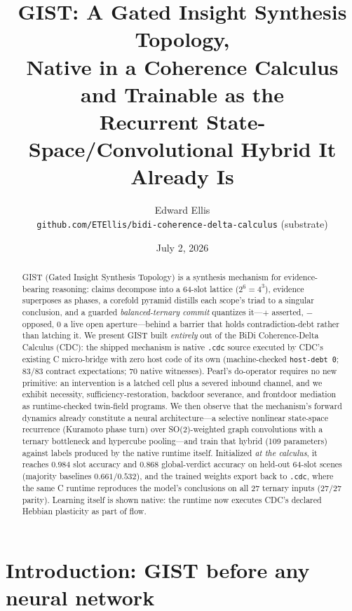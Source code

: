 \documentclass[11pt]{article}
\title{GIST: A Gated Insight Synthesis Topology,\\
Native in a Coherence Calculus and Trainable as the\\
Recurrent State-Space/Convolutional Hybrid It Already Is}
\author{Edward Ellis\\
\small\texttt{github.com/ETEllis/bidi-coherence-delta-calculus} (substrate)}
\date{July 2, 2026}
\begin{document}
\maketitle

\begin{abstract}
GIST (Gated Insight Synthesis Topology) is a synthesis mechanism for
evidence-bearing reasoning: claims decompose into a 64-slot lattice
($2^6{=}4^3$), evidence superposes as phases, a corefold pyramid distills
each scope's triad to a singular conclusion, and a guarded
\emph{balanced-ternary commit} quantizes it---$+$ asserted, $-$ opposed,
$0$ a live open aperture---behind a barrier that holds contradiction-debt
rather than latching it. We present GIST built \emph{entirely} out of the
BiDi Coherence-Delta Calculus (CDC): the shipped mechanism is native
\texttt{.cdc} source executed by CDC's existing C micro-bridge with zero
host code of its own (machine-checked \texttt{host-debt 0}; 83/83 contract
expectations; 70 native witnesses). Pearl's do-operator requires no new
primitive: an intervention is a latched cell plus a severed inbound
channel, and we exhibit necessity, sufficiency-restoration, backdoor
severance, and frontdoor mediation as runtime-checked twin-field programs.
We then observe that the mechanism's forward dynamics already constitute a
neural architecture---a selective nonlinear state-space recurrence
(Kuramoto phase turn) over SO(2)-weighted graph convolutions with a ternary
bottleneck and hypercube pooling---and train that hybrid (109 parameters)
against labels produced by the native runtime itself. Initialized
\emph{at the calculus}, it reaches $0.984$ slot accuracy and $0.868$
global-verdict accuracy on held-out 64-slot scenes (majority baselines
$0.661/0.532$), and the trained weights export back to \texttt{.cdc},
where the same C runtime reproduces the model's conclusions on all 27
ternary inputs ($27/27$ parity). Learning itself is shown native: the
runtime now executes CDC's declared Hebbian plasticity as part of flow.
\end{abstract}

\section{Introduction: GIST before any neural network}
\end{document}
